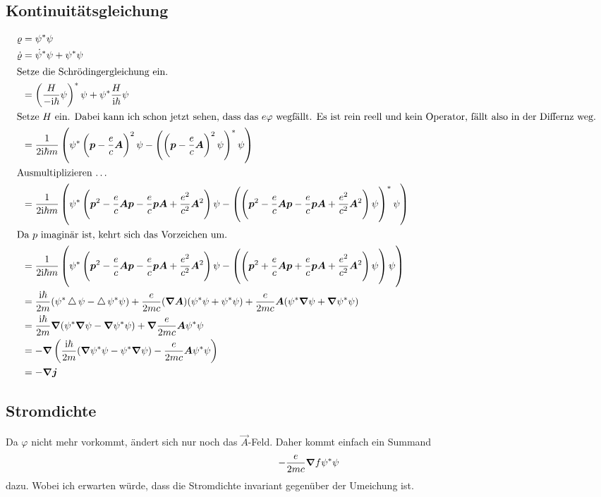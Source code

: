 \subsection{Kontinuitätsgleichung}

\begin{align*}
	\varrho &= \psi^* \psi \\
	\dot \varrho &= \dot \psi^* \psi + \psi^* \psi \\
	\intertext{%
		Setze die Schrödingergleichung ein.
	}
	&= \del{\frac{H}{-\ii \hbar} \psi}^* \psi + \psi^* \frac{H}{\ii \hbar} \psi \\
	\intertext{%
		Setze $H$ ein. Dabei kann ich schon jetzt sehen, dass das $e\varphi$
		wegfällt. Es ist rein reell und kein Operator, fällt also in der
		Differnz weg.
	}
	&= \frac{1}{2 \ii \hbar m} \del{\psi^* \del{\vec p - \frac ec \vec A}^2 \psi - \del{\del{\vec p - \frac ec \vec A}^2 \psi}^* \psi} \\
	\intertext{%
		Ausmultiplizieren …
	}
	&= \frac{1}{2 \ii \hbar m} \del{\psi^* \del{\vec p^2 - \frac ec \vec A \vec p - \frac ec \vec p \vec A + \frac{e^2}{c^2} \vec A^2} \psi - \del{\del{\vec p^2 - \frac ec \vec A \vec p - \frac ec \vec p \vec A + \frac{e^2}{c^2} \vec A^2} \psi}^* \psi} \\
	\intertext{%
		Da $p$ imaginär ist, kehrt sich das Vorzeichen um.
	}
	&= \frac{1}{2 \ii \hbar m} \del{\psi^* \del{\vec p^2 - \frac ec \vec A \vec p - \frac ec \vec p \vec A + \frac{e^2}{c^2} \vec A^2} \psi - \del{\del{\vec p^2 + \frac ec \vec A \vec p + \frac ec \vec p \vec A + \frac{e^2}{c^2} \vec A^2} \psi} \psi} \\
	&= \frac{\ii \hbar}{2m} (\psi^* \laplace \psi - \laplace \psi^* \psi) + \frac{e}{2mc}(\vnabla \vec A) (\psi^* \psi + \psi^* \psi) + \frac{e}{2mc} \vec A (\psi^* \vnabla \psi + \vnabla \psi^* \psi) \\
	&= \frac{\ii \hbar}{2m} \vnabla (\psi^* \vnabla \psi - \vnabla \psi^* \psi) + \vnabla \frac{e}{2mc} \vec A \psi^* \psi \\
	&= - \vnabla \del{\frac{\ii \hbar}{2m} (\vnabla \psi^* \psi - \psi^* \vnabla \psi) - \frac{e}{2mc} \vec A \psi^* \psi} \\
	&= - \vnabla \vec j
\end{align*}

\subsection{Stromdichte}

Da $\varphi$ nicht mehr vorkommt, ändert sich nur noch das $\vec A$-Feld. Daher
kommt einfach ein Summand
\[
	- \frac{e}{2mc} \boldsymbol{\nabla} f \psi^* \psi
\]
dazu. Wobei ich erwarten würde, dass die Stromdichte invariant gegenüber der
Umeichung ist.

